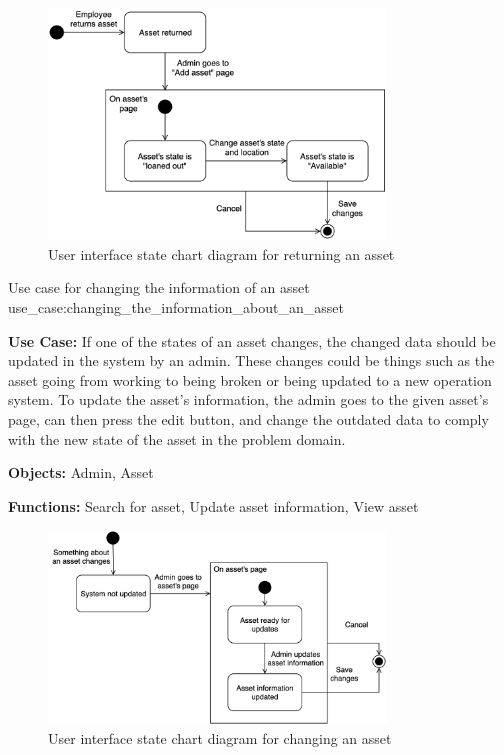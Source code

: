\begin{figure}[H]
    \centering
    \includegraphics[width=0.8\textwidth]{figures/UseCases/UC_Return_asset.png}
    \caption{User interface state chart diagram for returning an asset}
    \label{fig:return_asset_statechart}
\end{figure}

    {Use case for changing the information of an asset}
    {use_case:changing_the_information_about_an_asset}
    {
        \textbf{Use Case:} If one of the states of an asset changes, the changed data should be updated in the system by an admin. These changes could be things such as the asset going from working to being broken or being updated to a new operation system. To update the asset's information, the admin goes to the given asset's page, can then press the edit button, and change the outdated data to comply with the new state of the asset in the problem domain.
    
        \vskip 0.2cm
        
        \textbf{Objects:} Admin, Asset
        
        \vskip 0.2cm
        
        \textbf{Functions:} Search for asset, Update asset information, View asset
    }
    
\begin{figure}[H]
    \centering
    \includegraphics[width=0.8\textwidth]{figures/UseCases/UC_Change_asset.png}
    \caption{User interface state chart diagram for changing an asset}
    \label{fig:edit_asset_statechart}
\end{figure}


